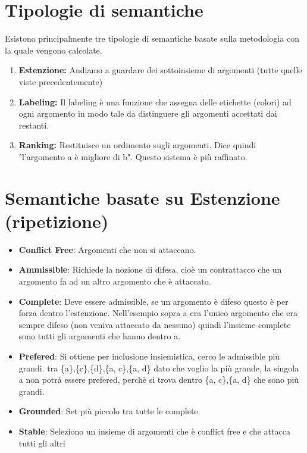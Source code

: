 \section{Tipologie di semantiche}
Esistono principalmente tre tipologie di semantiche basate sulla metodologia
con la quale vengono calcolate.
\begin{enumerate}
    \item \textbf{Estenzione:} Andiamo a guardare dei sottoinsieme di argomenti (tutte quelle viste precedentemente)
    \item \textbf{Labeling:} Il labeling è una funzione che assegna delle etichette (colori) ad ogni argomento in modo tale da distinguere gli argomenti accettati dai restanti.
    \item \textbf{Ranking:} Restituisce un ordimento sugli argomenti. Dice quindi "l’argomento a è migliore di b". Questo sistema è più raffinato.
\end{enumerate}
\section{Semantiche basate su Estenzione (ripetizione)}
\begin{itemize}
    \item \textbf{Conflict Free}: Argomenti che non si attaccano.
    \item \textbf{Ammissible}: Richiede la nozione di difesa, cioè un contrattacco che un argomento fa ad un altro argomento che è attaccato.
    \item \textbf{Complete}: Deve essere admissible, se un argomento è difeso questo è per forza dentro l’estenzione. Nell’esempio sopra a era l’unico argomento che era sempre difeso (non veniva attaccato da nessuno) quindi l’insieme complete sono tutti gli argomenti che hanno dentro a.
    \item \textbf{Prefered}: Si ottiene per inclusione insiemistica, cerco le admissible più grandi. tra \{a\},\{c\},\{d\},\{a, c\},\{a, d\} dato che voglio la più grande, la singola {a} non potrà essere prefered, perchè si trova dentro \{a, c\},\{a, d\} che sono più grandi.
    \item \textbf{Grounded}: Set più piccolo tra tutte le complete.
    \item \textbf{Stable}: Seleziono un insieme di argomenti che è conflict free e che attacca tutti gli altri
\end{itemize}
